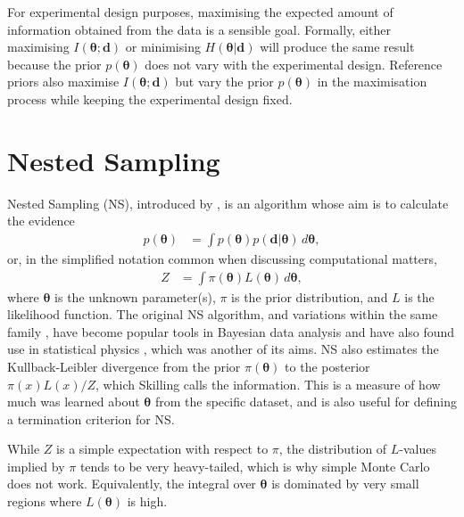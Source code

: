 \documentclass[entropy,article,accept,oneauthor,pdftex,10pt,a4paper]{mdpi}
\newcommand{\revision}{\color{darkblue}}
\renewcommand{\d}{\boldsymbol{d}}
\newcommand{\x}{\boldsymbol{\theta}}
\begin{document}
For experimental design purposes, maximising the expected amount
of information obtained from the data is a sensible goal.
Formally, either maximising $I(\x; \d)$ or
minimising $H(\x | \d)$ will produce the same result because the prior $p(\x)$
does not
vary with the experimental design. Reference priors
\citep{bernardo2005reference} also maximise $I(\x; \d)$ but vary the prior
$p(\x)$
in the maximisation process while keeping the experimental design fixed.

\section{Nested Sampling}

Nested Sampling (NS), introduced by
\citet{skilling2006nested}, is an algorithm whose aim is
to calculate the evidence {\revision
\begin{align}
p(\x) &= \int p(\x) p(\d | \x) \, d\x,
\end{align}
or, in the simplified notation common when discussing computational matters,
\begin{align}
Z &= \int \pi(\x) L(\x) \, d\x,
\end{align}}
\noindent where $\x$ is the unknown parameter(s), $\pi$ is the prior distribution,
and $L$ is the likelihood function. The original NS algorithm, and variations
within the same family \citep{feroz2009multinest, dns, handley2015polychord},
have become popular tools in Bayesian data analysis
\citep{knuth2015bayesian, pullen2014bayesian, exoplanet} and have also
found use in statistical physics \citep{partay2010efficient,
baldock2016determining, martiniani2014superposition}, which was another of
its aims.
{\revision
NS also estimates the Kullback-Leibler divergence from the prior
$\pi(\x)$ to the posterior $\pi(x)L(x)/Z$, which Skilling calls the
information. This is a measure of how much was learned about $\x$
from the specific dataset, and is also useful for defining a termination
criterion for NS.}

While $Z$ is a simple expectation with
respect to $\pi$, the
{\revision distribution of $L$-values implied by $\pi$}
tends to be very heavy-tailed, which is
why simple Monte Carlo does not work. Equivalently, the integral 
{\revision over $\x$} is dominated by very small regions where $L(\x)$ is high.
\end{document}
